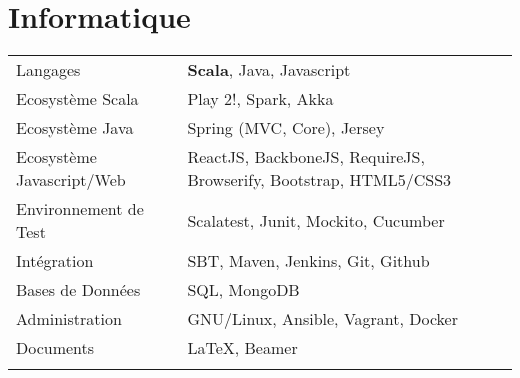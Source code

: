 \documentclass[11pt,a4paper]{moderncv}
\begin{document}
\section{Informatique}
\begin{tabular}{ll}
  \vspace{0.1cm}
  \hspace{0.1cm} Langages & \hspace{0.5cm} \textbf{Scala}, Java, Javascript \\ \vspace{0.1cm}
  \hspace{0.1cm} Ecosystème Scala & \hspace{0.5cm} Play 2!, Spark, Akka \\ \vspace{0.1cm}
  \hspace{0.1cm} Ecosystème Java & \hspace{0.5cm} Spring (MVC, Core), Jersey \\ \vspace{0.1cm}
  \hspace{0.1cm} Ecosystème Javascript/Web & \hspace{0.5cm} ReactJS, BackboneJS, RequireJS, Browserify, Bootstrap, HTML5/CSS3 \\ \vspace{0.1cm}
  \hspace{0.1cm} Environnement de Test & \hspace{0.5cm} Scalatest, Junit, Mockito, Cucumber \\ \vspace{0.1cm}
  \hspace{0.1cm} Intégration & \hspace{0.5cm} SBT, Maven, Jenkins, Git, Github \\ \vspace{0.1cm}
  \hspace{0.1cm} Bases de Données & \hspace{0.5cm} SQL, MongoDB \\ \vspace{0.1cm}
  \hspace{0.1cm} Administration & \hspace{0.5cm} GNU/Linux, Ansible, Vagrant, Docker \\ \vspace{0.1cm}
  \hspace{0.1cm} Documents & \hspace{0.5cm} \LaTeX, Beamer \\ \vspace{0.1cm}
\end{tabular}
\end{document}
